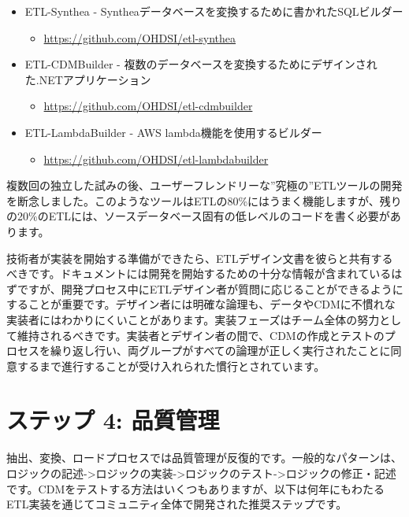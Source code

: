 \documentclass[
  11pt]{book}
\providecommand{\tightlist}{%
  \setlength{\itemsep}{0pt}\setlength{\parskip}{0pt}}
\theoremstyle{definition}
\theoremstyle{definition}
\theoremstyle{definition}
\theoremstyle{definition}
\theoremstyle{remark}
\begin{document}
\begin{itemize}
\tightlist
\item
  ETL-Synthea - Syntheaデータベースを変換するために書かれたSQLビルダー

  \begin{itemize}
  \tightlist
  \item
    \url{https://github.com/OHDSI/etl-synthea}
  \end{itemize}
\item
  ETL-CDMBuilder - 複数のデータベースを変換するためにデザインされた.NETアプリケーション

  \begin{itemize}
  \tightlist
  \item
    \url{https://github.com/OHDSI/etl-cdmbuilder}
  \end{itemize}
\item
  ETL-LambdaBuilder - AWS lambda機能を使用するビルダー

  \begin{itemize}
  \tightlist
  \item
    \url{https://github.com/OHDSI/etl-lambdabuilder}
  \end{itemize}
\end{itemize}

複数回の独立した試みの後、ユーザーフレンドリーな''究極の''ETLツールの開発を断念しました。このようなツールはETLの80\%にはうまく機能しますが、残りの20\%のETLには、ソースデータベース固有の低レベルのコードを書く必要があります。

技術者が実装を開始する準備ができたら、ETLデザイン文書を彼らと共有するべきです。ドキュメントには開発を開始するための十分な情報が含まれているはずですが、開発プロセス中にETLデザイン者が質問に応じることができるようにすることが重要です。デザイン者には明確な論理も、データやCDMに不慣れな実装者にはわかりにくいことがあります。実装フェーズはチーム全体の努力として維持されるべきです。実装者とデザイン者の間で、CDMの作成とテストのプロセスを繰り返し行い、両グループがすべての論理が正しく実行されたことに同意するまで進行することが受け入れられた慣行とされています。

\section{ステップ 4: 品質管理}\label{ux30b9ux30c6ux30c3ux30d7-4-ux54c1ux8ceaux7ba1ux7406}

抽出、変換、ロードプロセスでは品質管理が反復的です。一般的なパターンは、ロジックの記述-\textgreater ロジックの実装-\textgreater ロジックのテスト-\textgreater ロジックの修正・記述です。CDMをテストする方法はいくつもありますが、以下は何年にもわたるETL実装を通じてコミュニティ全体で開発された推奨ステップです。 
\end{document}
